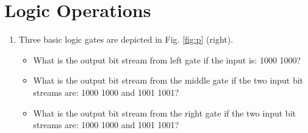 \documentclass{article}
\begin{document}
\section{Logic Operations}

\begin{enumerate}
\item Three basic logic gates are depicted in Fig. \ref{fig:p} (right).
\begin{itemize}
\item What is the output bit stream from left gate if the input is: 1000 1000? \\ \vspace{0.25cm}
\item What is the output bit stream from the middle gate if the two input bit streams are: 1000 1000 and 1001 1001? \\ \vspace{0.25cm}
\item What is the output bit stream from the right gate if the two input bit streams are: 1000 1000 and 1001 1001? \\ \vspace{0.25cm}
\end{itemize}
\end{enumerate}
\end{document}
